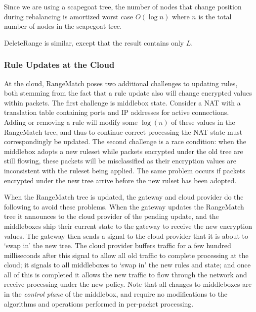 
Since we are using a scapegoat tree, the number of nodes that change position during rebalancing is amortized worst case $O(\log n)$ where $n$ is the total number of nodes in the scapegoat tree. 

DeleteRange is similar, except that the result contains only $L$. 

\subsubsection{Rule Updates at the Cloud}
\label{sec:updates}
At the cloud, RangeMatch poses two additional challenges to updating rules, both stemming from the fact that a rule update also will change encrypted values within packets.
The first challenge is middlebox state. Consider a NAT with a translation table containing ports and IP addresses for active connections. 
Adding or removing a rule will modify some $\log(n)$ of these values in the RangeMatch tree, and thus to continue correct processing the NAT state must correspondingly be updated.
The second challenge is a race condition: when the middlebox adopts a new ruleset while packets encrypted under the old tree are still flowing, these packets will be misclassified as their encryption values are inconsistent with the ruleset being applied. 
The same problem occurs if packets encrypted under the new tree arrive before the new rulset has been adopted.

When the RangeMatch tree is updated, the gateway and cloud provider do the following to avoid these problems. 
When the gateway updates the RangeMatch tree it announces to the cloud provider of the pending update, and the middleboxes ship their current state to the gateway to receive the new encryption values.
The gateway then sends a signal to the cloud provider that it is about to `swap in' the new tree. 
The cloud provider buffers traffic for a few hundred milliseconds after this signal to allow all old traffic to complete processing at the cloud; it signals to all middleboxes to `swap in' the new rules and state; and once all of this is completed it allows the new traffic to flow through the network and receive processing under the new policy.
Note that all changes to middleboxes are in the {\it control plane} of the middlebox, and require no modifications to the algorithms and operations performed in per-packet processing.
